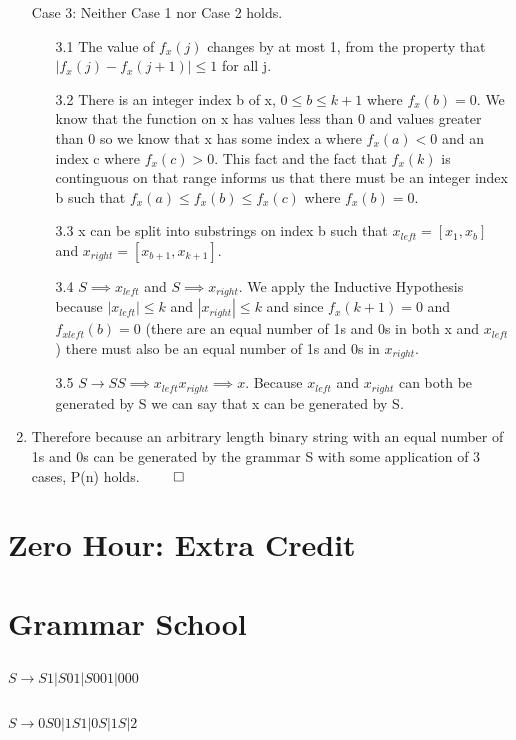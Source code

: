 \documentclass[11pt]{article}
\def\imp{\rightarrow}
\begin{document}
\begin{enumerate}
	Case 3: Neither Case 1 nor Case 2 holds. 
	\begin{enumerate}
		\item[3.1] The value of $f_x(j)$ changes by at most 1, from the property that $|f_x(j) - f_x(j+1)|\leq 1$ for all j. 
		\item[3.2] There is an integer index b of x, $0 \leq b \leq k+1$ where $f_x(b)=0$. We know that the function on x has values less than 0 and values greater than 0 so we know that x has some index a where $f_x(a)<0$ and an index c where $f_x(c)>0$. This fact and the fact that $f_x(k)$ is continguous on that range informs us that there must be an integer index b such that $f_x(a) \leq f_x(b) \leq f_x(c)$ where $f_x(b)=0$.
		\item[3.3] x can be split into substrings on index b such that $x_{left} = [x_1, x_b]$ and $x_{right}=[x_{b+1}, x_{k+1}]$. 
		\item[3.4] $S \implies x_{left}$ and $S \implies x_{right}$. We apply the Inductive Hypothesis because $|x_{left}| \leq k$ and $|x_{right}|\leq k$ and since $f_x(k+1) =0$ and $f_{xleft}(b)=0$ (there are an equal number of 1s and 0s in both x and $x_{left}$) there must also be an equal number of 1s and 0s in $x_{right}$. 
		\item[3.5] $S \imp SS \implies x_{left}x_{right} \implies x$. Because $x_{left}$ and $x_{right}$ can both be generated by S we can say that x can be generated by S. 
		\end{enumerate}
	\item Therefore because an arbitrary length binary string with an equal number of 1s and 0s can be generated by the grammar S with some application of 3 cases, P(n) holds. $\qed$
\end{enumerate}

\section{Zero Hour: Extra Credit} %

\section{Grammar School} %
\subsection{}
$S \imp S1 | S01 | S001 | 000$

\subsection{}
$S \imp 0S0 | 1S1 | 0S | 1S | 2$
\end{document}
